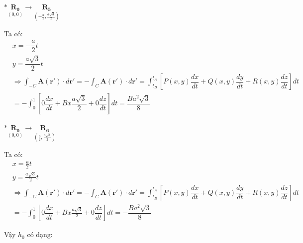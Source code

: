\documentclass{report}
\begin{document}
\noindent $\ast \underset{(0,0)}{\mathbf{R_0}}  \longrightarrow \underset{(-\frac{a}{2},\frac{a\sqrt{3}}{2})}{\mathbf{R_5}}$

Ta có:
\begin{align*}
	 & x = -\dfrac{a}{2}t                                                                                                                                                                                                            \\
	 & y = \dfrac{a\sqrt{3}}{2}t                                                                                                                                                                                                     \\
	 & \Rightarrow \int_{-C} \mathbf{A}(\mathbf{r'})\cdot d\mathbf{r'} =-\int_{C} \mathbf{A}(\mathbf{r'})\cdot d\mathbf{r'} =  \int_{t_B}^{t_A} \left[ P(x,y)\dfrac{dx}{dt} + Q(x,y)\dfrac{dy}{dt} + R(x,y)\dfrac{dz}{dt} \right] dt \\
	 & = -\int_{0}^{1} \left[ 0\dfrac{dx}{dt} + Bx\dfrac{a\sqrt{3}}{2} + 0\dfrac{dz}{dt} \right] dt = \dfrac{Ba^2\sqrt{3}}{8}
\end{align*}

\clearpage

\noindent $\ast \underset{(0,0)}{\mathbf{R_0}}  \longrightarrow \underset{(\frac{a}{2},\frac{a\sqrt{3}}{2})}{\mathbf{R_6}}$

Ta có:
\begin{align*}
	 & x = \frac{a}{2}t                                                                                                                                                                                                              \\
	 & y = \frac{a\sqrt{3}}{2}t                                                                                                                                                                                                      \\
	 & \Rightarrow \int_{-C} \mathbf{A}(\mathbf{r'})\cdot d\mathbf{r'} =-\int_{C} \mathbf{A}(\mathbf{r'})\cdot d\mathbf{r'} =  \int_{t_B}^{t_A} \left[ P(x,y)\dfrac{dx}{dt} + Q(x,y)\dfrac{dy}{dt} + R(x,y)\dfrac{dz}{dt} \right] dt \\
	 & = -\int_{0}^{1} \left[ 0\dfrac{dx}{dt} + Bx \frac{a\sqrt{3}}{2} + 0\dfrac{dz}{dt} \right] dt = -\dfrac{Ba^2\sqrt{3}}{8}
\end{align*}

\noindent Vậy $h_0$ có dạng:
\end{document}
